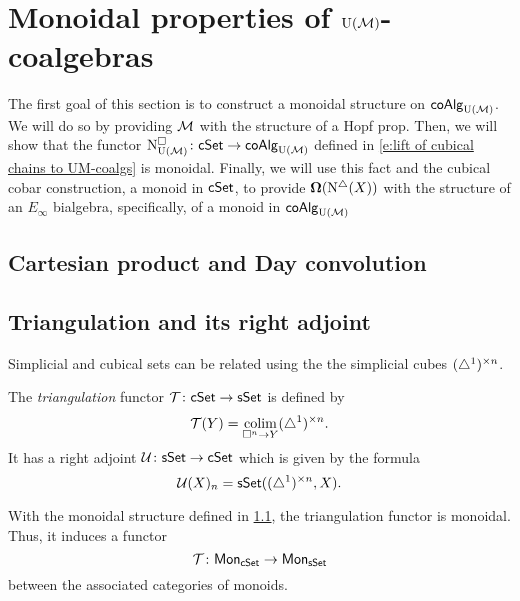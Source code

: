 
\section{Monoidal properties of ${\operatorname{U}(\mathcal{M})}$-coalgebras}

The first goal of this section is to construct a monoidal structure on $\mathsf{coAlg}_{\operatorname{U}(\mathcal{M})}$.
We will do so by providing $\mathcal{M}$ with the structure of a Hopf prop.
Then, we will show that the functor $\operatorname{N^{\square}_{{\operatorname{U}(\mathcal{M})}}} \colon \mathsf{cSet} \to \mathsf{coAlg}_{{\operatorname{U}(\mathcal{M})}}$ defined in \eqref{e:lift of cubical chains to UM-coalgs} is monoidal.
Finally, we will use this fact and the cubical cobar construction, a monoid in $\mathsf{cSet}$, to provide $\operatorname{\mathbf{\Omega}}(\operatorname{N^{\triangle}}(X))$ with the structure of an $E_\infty$ bialgebra, specifically, of a monoid in $\mathsf{coAlg}_{{\operatorname{U}(\mathcal{M})}}$

\subsection{Cartesian product and Day convolution} \label{ss:day convolution}




\subsection{Triangulation and its right adjoint} \label{ss:triangulation and its adjoint}

Simplicial and cubical sets can be related using the the simplicial cubes $(\triangle^1)^{\times n}$.

The \textit{triangulation} functor $\mathcal{T} \colon \mathsf{cSet} \to \mathsf{sSet}$ is defined by
\begin{equation*}
\mathcal{T}(Y) = \operatorname*{colim}_{\square^n \to Y} (\triangle^1)^{\times n}.
\end{equation*}
It has a right adjoint $\mathcal{U} \colon \mathsf{sSet} \to \mathsf{cSet}$ which is given by the formula
\begin{equation*}
\mathcal{U}(X)_n = \mathsf{sSet}((\triangle^1)^{\times n}, X).
\end{equation*}

With the monoidal structure defined in \cref{ss:day convolution}, the triangulation functor is monoidal.
Thus, it induces a functor
\begin{equation*}
\mathcal{T} \colon \mathsf{Mon}_{\mathsf{cSet}} \to \mathsf{Mon}_{\mathsf{sSet}}
\end{equation*}
between the associated categories of monoids.

